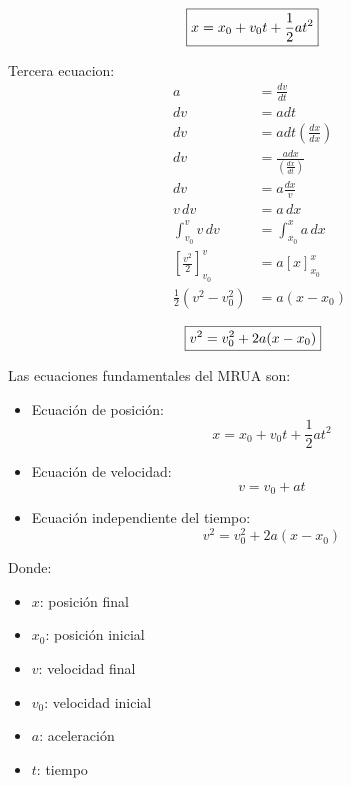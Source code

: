 \vspace{-20pt}

\begin{align}
    \Aboxed{x = x_0 + v_0 t + \frac{1}{2}at^2}
\end{align}

Tercera ecuacion:
\begin{align*}
a &= \frac{dv}{dt}\\
dv &= a dt\\
dv &= a dt(\frac{dx}{dx})\\
dv &= \frac{a dx}{(\frac{dx}{dt})}\\
dv &= a\frac{dx}{v}\\
v\,dv &= a\,dx\\
\int_{v_0}^{v} v\,dv &= \int_{x_0}^{x} a\,dx\\
\left[\frac{v^2}{2}\right]_{v_0}^{v} &= a\left[x\right]_{x_0}^{x}\\
\frac{1}{2}(v^2 - v_0^2) &= a(x - x_0)
\end{align*}

\vspace{-30pt}

\begin{align}
    \Aboxed{v^2 = v_0^2 + 2a(x - x_0)}
\end{align}

Las ecuaciones fundamentales del MRUA son:

\begin{itemize}
    \item Ecuación de posición:
    \[
    x = x_0 + v_0 t + \frac{1}{2}at^2
    \]

    \item Ecuación de velocidad:
    \[
    v = v_0 + at
    \]

    \item Ecuación independiente del tiempo:
    \[
    v^2 = v_0^2 + 2a(x - x_0)
    \]
\end{itemize}

Donde:
\begin{itemize}
    \setlength{\itemsep}{0pt}
    \item $x$: posición final
    \item $x_0$: posición inicial
    \item $v$: velocidad final
    \item $v_0$: velocidad inicial
    \item $a$: aceleración
    \item $t$: tiempo
\end{itemize}

